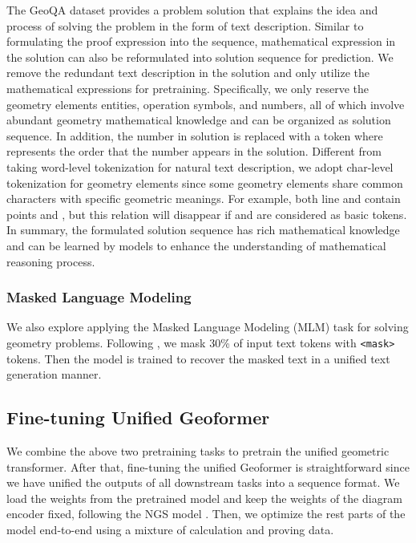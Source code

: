 \documentclass[11pt]{article}
\begin{document}
The GeoQA dataset provides a problem solution that explains the idea and process of solving the problem in the form of text description.
Similar to formulating the proof expression into the sequence, mathematical expression in the solution can also be reformulated into solution sequence for prediction.
We remove the redundant text description in the solution and only utilize the mathematical expressions for pretraining. Specifically, we only reserve the geometry elements entities, operation symbols, and numbers, all of which involve abundant geometry mathematical knowledge and can be organized as solution sequence.
In addition, the number in solution is replaced with a token  where  represents the order that the number appears in the solution. 
Different from taking word-level tokenization for natural text description, we adopt char-level tokenization for geometry elements since some geometry elements share common characters with specific geometric meanings.
For example, both line  and  contain points  and , but this relation will disappear if  and  are considered as basic tokens. 
In summary, the formulated solution sequence has rich mathematical knowledge and can be learned by models to enhance the understanding of mathematical reasoning process.



\subsubsection{Masked Language Modeling}
We also explore applying the Masked Language Modeling (MLM) task for solving geometry problems.
Following \cite{cho2021unifying},  we mask 30\% of input text tokens with \texttt{<mask>} tokens. Then the model is trained to recover the masked text in a unified text generation manner.



\subsection{Fine-tuning Unified Geoformer}

We combine the above two pretraining tasks to pretrain the unified geometric transformer.
After that, fine-tuning the unified Geoformer is straightforward since we have unified the outputs of all downstream tasks into a sequence format.
We load the weights from the pretrained model and keep the weights of the diagram encoder fixed, following the NGS model \cite{chen2021geoqa}.
Then, we optimize the rest parts of the model end-to-end using a mixture of calculation and proving data.
\end{document}
